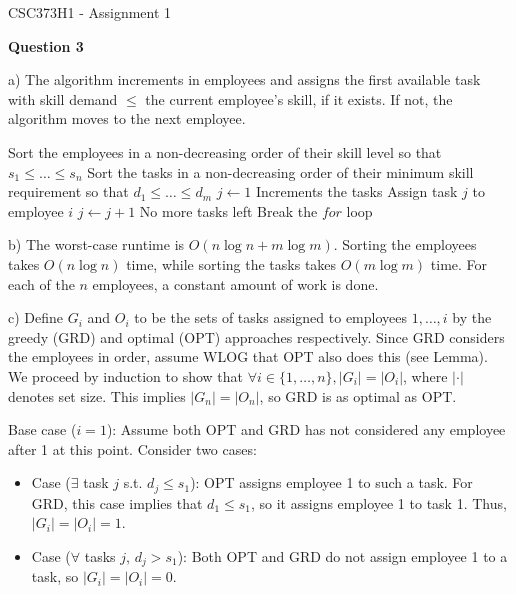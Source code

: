 \documentclass[11pt]{article}
\begin{document}
\begin{center}
    {\Large CSC373H1 - Assignment 1}
\end{center}

\textbf{Question 3}

a) The algorithm increments in employees and assigns the first available task with skill demand $\leq$ the current employee's skill, if it exists. If not, the algorithm moves to the next employee.

\begin{algorithm}[H]
\caption{Task Assignment}
\begin{algorithmic}[1]
\State Sort the employees in a non-decreasing order of their skill level so that $s_1 \leq \ldots \leq s_n$
\State Sort the tasks in a non-decreasing order of their minimum skill requirement so that $d_1 \leq \ldots \leq d_m$
\State $j \gets 1$ \Comment Increments the tasks
    \State Assign task $j$ to employee $i$
    \State $j \gets j + 1$
\EndIf
{} \Comment No more tasks left
    \State Break the $for$ loop \EndIf
\EndFor
\end{algorithmic}
\end{algorithm}

b) The worst-case runtime is $O(n\log n + m\log m)$. Sorting the employees takes $O(n\log n)$ time, while sorting the tasks takes $O(m\log m)$ time. For each of the $n$ employees, a constant amount of work is done.

c) Define $G_i$ and $O_i$ to be the sets of tasks assigned to employees $1,\ldots,i$ by the greedy (GRD) and optimal (OPT) approaches respectively. Since GRD considers the employees in order, assume WLOG that OPT also does this (see Lemma). We proceed by induction to show that $\forall i\in\{1,\ldots,n\},|G_i|=|O_i|$, where $|\cdot|$ denotes set size. This implies $|G_n|=|O_n|$, so GRD is as optimal as OPT.

Base case ($i=1$): Assume both OPT and GRD has not considered any employee after 1 at this point. Consider two cases:

\begin{itemize}
    \item Case ($\exists$ task $j$ s.t. $d_j\leq s_1$): OPT assigns employee 1 to such a task. For GRD, this case implies that $d_1\leq s_1$, so it assigns employee 1 to task 1. Thus, $|G_i|=|O_i|=1$.
    \item Case ($\forall$ tasks $j$, $d_j > s_1$): Both OPT and GRD do not assign employee 1 to a task, so $|G_i|=|O_i|=0$.
\end{itemize}
\end{document}
